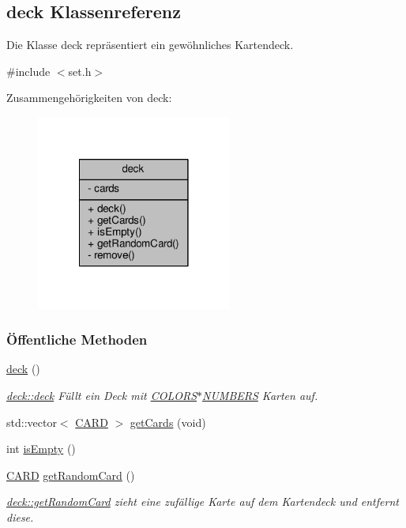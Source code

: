 \hypertarget{classdeck}{\subsection{deck Klassenreferenz}
\label{classdeck}
}


Die Klasse deck repräsentiert ein gewöhnliches Kartendeck.  




{\ttfamily \#include $<$set.\-h$>$}



Zusammengehörigkeiten von deck\-:\nopagebreak
\begin{figure}[H]
\begin{center}
\leavevmode
\includegraphics[width=182pt]{d9/d22/classdeck__coll__graph}
\end{center}
\end{figure}
\subsubsection*{Öffentliche Methoden}
\begin{DoxyCompactItemize}
\item 
\hyperlink{classdeck_a2ff8465ba7b13201bdf650fe461b442e}{deck} ()
\begin{DoxyCompactList}\small\item\em \hyperlink{classdeck_a2ff8465ba7b13201bdf650fe461b442e}{deck\-::deck} Füllt ein Deck mit \hyperlink{set_8h_a883046b8f0d1f6368a9b9eaf5ca36af3}{C\-O\-L\-O\-R\-S}$\ast$\hyperlink{set_8h_a52c6eed29863def7303121b65975e83b}{N\-U\-M\-B\-E\-R\-S} Karten auf. \end{DoxyCompactList}\item 
std\-::vector$<$ \hyperlink{struct_c_a_r_d}{C\-A\-R\-D} $>$ \hyperlink{classdeck_a26cfcf4196728cde8b904dbcf63bc815}{get\-Cards} (void)
\item 
int \hyperlink{classdeck_a3a190c2877d3822b7379d6a9fa2c050b}{is\-Empty} ()
\item 
\hyperlink{struct_c_a_r_d}{C\-A\-R\-D} \hyperlink{classdeck_a8e33dbdafe69c55d968526d9543245ec}{get\-Random\-Card} ()
\begin{DoxyCompactList}\small\item\em \hyperlink{classdeck_a8e33dbdafe69c55d968526d9543245ec}{deck\-::get\-Random\-Card} zieht eine zufällige Karte auf dem Kartendeck und entfernt diese. \end{DoxyCompactList}\end{DoxyCompactItemize}
